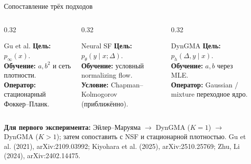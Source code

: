 \documentclass[10pt,aspectratio=169]{beamer}
\begin{document}
\begin{frame}{Сопоставление трёх подходов}
\vspace{0.09cm}
\begin{columns}[T,onlytextwidth]
\begin{column}{0.32\textwidth}
\begin{block}{Gu et al.}
\textbf{Цель:} $p_\infty(x)$.\\[0.13cm]
\textbf{Обучение:} $a,b^2$ и сеть плотности.\\[0.13cm]
\textbf{Оператор:} стационарный Фоккер--Планк.
\end{block}
\end{column}
\begin{column}{0.32\textwidth}
\begin{block}{Neural SF}
\textbf{Цель:} $p_\theta(y\mid x;\Delta)$.\\[0.13cm]
\textbf{Обучение:} условный normalizing flow.\\[0.13cm]
\textbf{Условие:} Chapman--Kolmogorov (приближённо).
\end{block}
\end{column}
\begin{column}{0.32\textwidth}
\begin{block}{DynGMA}
\textbf{Цель:} $p_h(\Delta,y\mid x)$.\\[0.13cm]
\textbf{Обучение:} $a,b$ через MLE.\\[0.13cm]
\textbf{Оператор:} Gaussian / mixture переходное ядро.
\end{block}
\end{column}
\end{columns}
\vspace{0.18cm}
\textbf{Для первого эксперимента:} Эйлер--Маруяма $\rightarrow$ DynGMA ($K=1$) $\rightarrow$ DynGMA ($K>1$); затем сопоставить с NSF и стационарной плотностью.
\vfill
{\tiny\color{graytext}Gu et al. (2021), arXiv:2109.03992; Kiyohara et al. (2025), arXiv:2510.25769; Zhu, Li (2024), arXiv:2402.14475.}
\end{frame}
\end{document}

